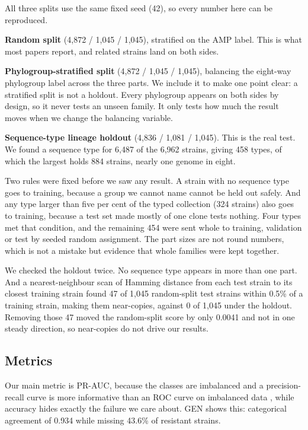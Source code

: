 \documentclass[conference]{IEEEtran}
\begin{document}
All three splits use the same fixed seed (42), so every number here can be
reproduced.

\textbf{Random split} (4{,}872 / 1{,}045 / 1{,}045), stratified on the AMP label.
This is what most papers report, and related strains land on both sides.

\textbf{Phylogroup-stratified split} (4{,}872 / 1{,}045 / 1{,}045), balancing the
eight-way phylogroup label across the three parts. We include it to make one point
clear: a stratified split is not a holdout. Every phylogroup appears on both sides
by design, so it never tests an unseen family. It only tests how much the result
moves when we change the balancing variable.

\textbf{Sequence-type lineage holdout} (4{,}836 / 1{,}081 / 1{,}045). This is the
real test. We found a sequence type for 6{,}487 of the 6{,}962 strains, giving 458
types, of which the largest holds 884 strains, nearly one genome in eight.

Two rules were fixed before we saw any result. A strain with no sequence type goes
to training, because a group we cannot name cannot be held out safely. And any type
larger than five per cent of the typed collection (324 strains) also goes to
training, because a test set made mostly of one clone tests nothing. Four types met
that condition, and the remaining 454 were sent whole to training, validation or
test by seeded random assignment. The part sizes are not round numbers, which is not
a mistake but evidence that whole families were kept together.

We checked the holdout twice. No sequence type appears in more than one part. And a
nearest-neighbour scan of Hamming distance from each test strain to its closest
training strain found 47 of 1{,}045 random-split test strains within 0.5\% of a
training strain, making them near-copies, against 0 of 1{,}045 under the holdout.
Removing those 47 moved the random-split score by only 0.0041 and not in one steady
direction, so near-copies do not drive our results.

\subsection{Metrics}

Our main metric is PR-AUC, because the classes are imbalanced and a precision-recall
curve is more informative than an ROC curve on imbalanced data \cite{saito2015},
while accuracy hides exactly the failure we care about. GEN shows this: categorical
agreement of 0.934 while missing 43.6\% of resistant strains.
\end{document}
